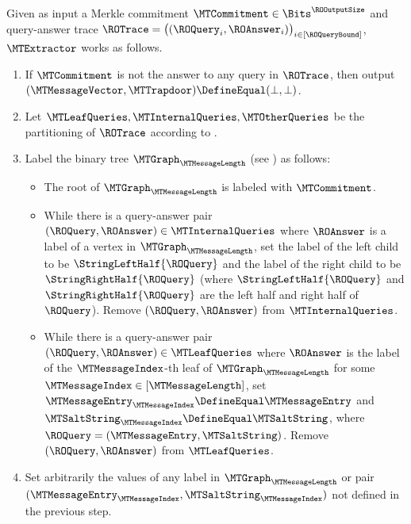 \begin{construction}
\label{construction:mt-extractor}
Given as input a Merkle commitment $\MTCommitment \in \Bits^{\ROOutputSize}$ and query-answer trace $\ROTrace = \big( (\ROQuery_{i},\ROAnswer_{i}) \big)_{i \in [\ROQueryBound]}$, $\MTExtractor$ works as follows.
\begin{enumerate}[noitemsep]

\item If $\MTCommitment$ is not the answer to any query in $\ROTrace$, then output $(\MTMessageVector,\MTTrapdoor) \DefineEqual (\bot,\bot)$.

\item \label{step:mt-extractor-partition-queries}
Let $\MTLeafQueries,\MTInternalQueries,\MTOtherQueries$ be the partitioning of $\ROTrace$ according to .

\item \label{step:mt-extractor-build-tree}
Label the binary tree $\MTGraph_{\MTMessageLength}$ (see ) as follows:
\begin{itemize}
  \item The root of $\MTGraph_{\MTMessageLength}$ is labeled with $\MTCommitment$.
  \item While there is a query-answer pair $(\ROQuery, \ROAnswer) \in \MTInternalQueries$ where $\ROAnswer$ is a label of a vertex in $\MTGraph_{\MTMessageLength}$, set the label of the left child to be $\StringLeftHalf{\ROQuery}$ and the label of the right child to be $\StringRightHalf{\ROQuery}$ (where $\StringLeftHalf{\ROQuery}$ and $\StringRightHalf{\ROQuery}$ are the left half and right half of $\ROQuery$). Remove $(\ROQuery,\ROAnswer)$ from $\MTInternalQueries$.
  \item While there is a query-answer pair $(\ROQuery,\ROAnswer) \in \MTLeafQueries$ where $\ROAnswer$ is the label of the $\MTMessageIndex$-th leaf of $\MTGraph_{\MTMessageLength}$ for some $\MTMessageIndex \in [\MTMessageLength]$, set $\MTMessageEntry_{\MTMessageIndex} \DefineEqual \MTMessageEntry$ and $\MTSaltString_{\MTMessageIndex} \DefineEqual \MTSaltString$, where $\ROQuery = (\MTMessageEntry,\MTSaltString)$. Remove $(\ROQuery,\ROAnswer)$ from $\MTLeafQueries$.
\end{itemize}

\item \label{step:mt-extractor-fill-rest}
Set arbitrarily the values of any label in $\MTGraph_{\MTMessageLength}$ or pair $(\MTMessageEntry_{\MTMessageIndex},\MTSaltString_{\MTMessageIndex})$ not defined in the previous step.


\end{enumerate}
\end{construction}

